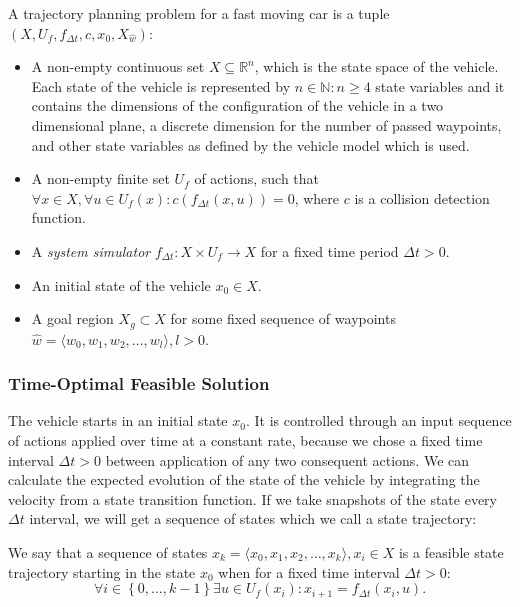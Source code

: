 \begin{defn}

	A trajectory planning problem for a fast moving car is a tuple $\left(X, U_f, f_{\Delta t}, c, x_0, X_{\hat{w}}\right)$:

	\begin{itemize}
		\item A non-empty continuous set $X\subseteq\mathbb{R}^n$, which is the state space of the vehicle. Each state of the vehicle is represented by $n\in\mathbb{N}:n\geq4$ state variables and it contains the dimensions of the configuration of the vehicle in a two dimensional plane, a discrete dimension for the number of passed waypoints, and other state variables as defined by the vehicle model which is used.

		\item A non-empty finite set $U_f$ of actions, such that $\forall x\in X, \forall u\in U_f(x): c(f_{\Delta t}(x, u))=0$, where $c$ is a collision detection function.

		\item A \textit{system simulator} $f_{\Delta t}:X\times U_f \rightarrow X$ for a fixed time period $\Delta t>0$.
		
		\item An initial state of the vehicle $x_0 \in X$.

		\item A goal region $X_g\subset X$ for some fixed sequence of waypoints \\ $\hat{w}=\langle w_0, w_1, w_2,\ldots, w_l \rangle, l>0$.
	\end{itemize}
\end{defn}

\subsubsection{Time-Optimal Feasible Solution}

The vehicle starts in an initial state $x_0$. It is controlled through an input sequence of actions applied over time at a constant rate, because we chose a fixed time interval $\Delta t>0$ between application of any two consequent actions. We can calculate the expected evolution of the state of the vehicle by integrating the velocity from a state transition function. If we take snapshots of the state every $\Delta t$ interval, we will get a sequence of states which we call a state trajectory:

\begin{defn}
	We say that a sequence of states $\hat{x_k}=\langle x_0,x_1,x_2,\dots,x_k \rangle ,x_i\in X$ is a feasible state trajectory starting in the state $x_0$ when for a fixed time interval $\Delta t>0$:
	\[
	\forall i \in \left\{ 0,\ldots,k-1\right\} \exists u\in U_f(x_i): x_{i+1}=f_{\Delta t} (x_i,u).
	\]
\end{defn}

